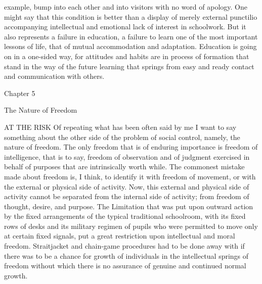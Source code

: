 example, bump into each other and into visitors with no word of apology. One might say 
that this condition is better than a display of merely external punctilio accompanying 
intellectual and emotional lack of interest in schoolwork. But it also represents a failure 
in education, a failure to learn one of the most important lessons of life, that of mutual 
accommodation and adaptation. Education is going on in a one-sided way, for attitudes 
and habits are in process of formation that stand in the way of the future learning that 
springs from easy and ready contact and communication with others. 


Chapter 5 

The Nature of Freedom 

AT THE RISK Of repeating what has been often said by me I want to say something 
about the other side of the problem of social control, namely, the nature of freedom. The 
only freedom that is of enduring importance is freedom of intelligence, that is to say, 
freedom of observation and of judgment exercised in behalf of purposes that are 
intrinsically worth while. The commonest mistake made about freedom is, I think, to 
identify it with freedom of movement, or with the external or physical side of activity. 
Now, this external and physical side of activity cannot be separated from the internal side 
of activity; from freedom of thought, desire, and purpose. The Limitation that was put 
upon outward action by the fixed arrangements of the typical traditional schoolroom, 
with its fixed rows of desks and its military regimen of pupils who were permitted to 
move only at certain fixed signals, put a great restriction upon intellectual and moral 
freedom. Straitjacket and chain-game procedures had to be done away with if there was 
to be a chance for growth of individuals in the intellectual springs of freedom without 
which there is no assurance of genuine and continued normal growth. 

